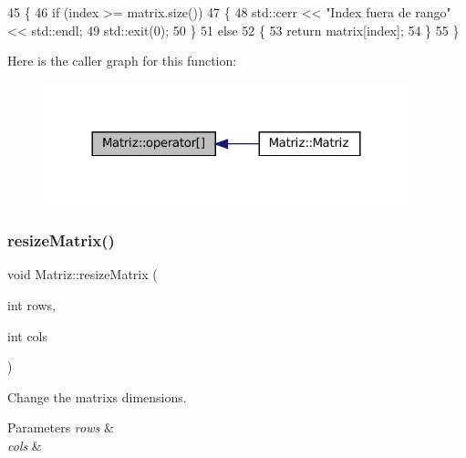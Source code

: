 \begin{DoxyCode}
45 \{
46   \textcolor{keywordflow}{if} (index >= matrix.size())
47   \{
48     std::cerr << \textcolor{stringliteral}{"Index fuera de rango"} << std::endl;
49     std::exit(0);
50   \}
51   \textcolor{keywordflow}{else}
52   \{
53     \textcolor{keywordflow}{return} matrix[index];
54   \}
55 \}
\end{DoxyCode}
Here is the caller graph for this function\+:
\nopagebreak
\begin{figure}[H]
\begin{center}
\leavevmode
\includegraphics[width=300pt]{classMatriz_a5516a9b9524e4604d4b3040628be50e9_icgraph}
\end{center}
\end{figure}
\mbox{\label{classMatriz_aa929f933e9088dc0efecaa9a46d555d9}} 
\subsubsection{\texorpdfstring{resize\+Matrix()}{resizeMatrix()}}
{\footnotesize\ttfamily void Matriz\+::resize\+Matrix (\begin{DoxyParamCaption}\item[{int}]{rows,  }\item[{int}]{cols }\end{DoxyParamCaption})}



Change the matrix\textquotesingle{}s dimensions. 


\begin{DoxyParams}{Parameters}
{\em rows} & \\
\hline
{\em cols} & \\
\hline
\end{DoxyParams}

